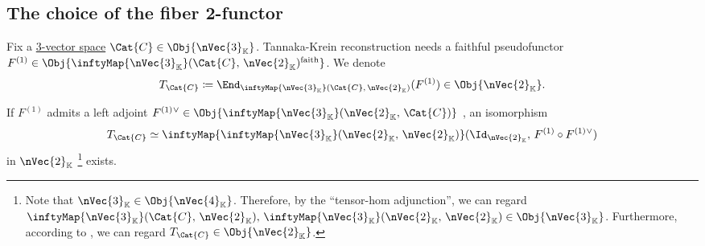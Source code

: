 \documentclass[TQFT_main]{subfiles}
\begin{document}

\subsection{The choice of the fiber 2-functor}

Fix a \hyperref[def:nPrK]{3-vector space} $\Cat{C} \in \Obj{\nVec{3}_{\mathbb{K}}}$. 
Tannaka-Krein reconstruction needs a faithful pseudofunctor $F^{(1)} \in \Obj{\inftyMap{\nVec{3}_{\mathbb{K}}}(\Cat{C},\, \nVec{2}_{\mathbb{K}})^{\text{faith}}}$.
We denote
\begin{align}
    T_{\Cat{C}} \coloneqq \End_{\inftyMap{\nVec{3}_{\mathbb{K}}}(\Cat{C},\, \nVec{2}_{\mathbb{K}})} (F^{(1)}) \in \Obj{\nVec{2}_{\mathbb{K}}}.
\end{align}

If $F^{(1)}$ admits a left adjoint $F^{(1)}{}^\vee \in \Obj{\inftyMap{\nVec{3}_{\mathbb{K}}} (\nVec{2}_{\mathbb{K}},\, \Cat{C})}$ , an isomorphism
\begin{align}
    T_{\Cat{C}} \simeq \inftyMap{\inftyMap{\nVec{3}_{\mathbb{K}}} (\nVec{2}_{\mathbb{K}},\, \nVec{2}_{\mathbb{K}})} (\Id_{\nVec{2}_{\mathbb{K}}},\, F^{(1)} \circ F^{(1)}{}^{\vee})
\end{align}
in $\nVec{2}_{\mathbb{K}}$
\footnote{
    Note that $\nVec{3}_{\mathbb{K}} \in \Obj{\nVec{4}_{\mathbb{K}}}$.
    Therefore, by the ``tensor-hom adjunction'', we can regard $\inftyMap{\nVec{3}_{\mathbb{K}}}(\Cat{C},\, \nVec{2}_{\mathbb{K}}),\, \inftyMap{\nVec{3}_{\mathbb{K}}} (\nVec{2}_{\mathbb{K}},\, \nVec{2}_{\mathbb{K}}) \in \Obj{\nVec{3}_{\mathbb{K}}}$.
    Furthermore, according to , we can regard $T_{\Cat{C}} \in \Obj{\nVec{2}_{\mathbb{K}}}$.
}
exists.
\end{document}
